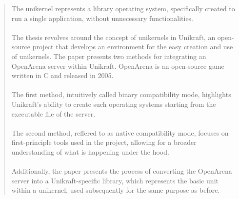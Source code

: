 \documentclass{thesis.cs.pub.ro}
\begin{document}
\begin{frontmatter}
\begin{abstract}
The unikernel represents a library operating system, specifically created to run a single application, without unnecessary functionalities. \\ \\
The thesis revolves around the concept of unikernels in Unikraft, an open-source project that develops an environment for the easy creation and use of unikernels. The paper presents two methods for integrating an OpenArena server within Unikraft. OpenArena is an open-source game written in C and released in 2005. \\ \\
The first method, intuitively called binary compatibility mode, highlights Unikraft's ability to create such operating systems starting from the executable file of the server. \\ \\
The second method, reffered to as native compatibility mode, focuses on first-principle tools used in the project, allowing for a broader understanding of what is happening under the hood. \\ \\
Additionally, the paper presents the process of converting the OpenArena server into a Unikraft-specific library, which represents the basic unit within a unikernel, used subsequently for the same purpose as before.
\end{abstract}

\end{frontmatter} %

\onehalfspacing






\printindex
\end{document}
